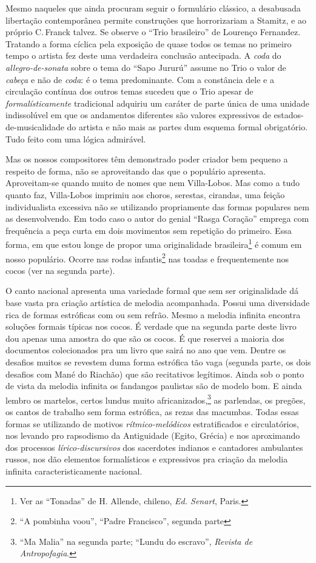 Mesmo naqueles que ainda procuram seguir o formulário clássico, a
desabusada libertação contemporânea permite construções que
horrorizariam a Stamitz, e ao próprio C.\,Franck talvez. Se observe o
``Trio brasileiro'' de Lourenço Fernandez. Tratando a forma cíclica pela
exposição de quase todos os temas no primeiro tempo o artista fez deste
uma verdadeira conclusão antecipada. A \textit{coda} do \textit{allegro-de-sonata} sobre o
tema do ``Sapo Jururú'' assume no Trio o valor de \textit{cabeça} e não de \textit{coda}: é
o tema predominante. Com a constância dele e a circulação contínua dos
outros temas sucedeu que o Trio apesar de \textit{formalísticamente} tradicional
adquiriu um caráter de parte única de uma unidade indissolúvel em que os
andamentos diferentes são valores expressivos de estados-de-musicalidade
do artista e não mais as partes dum esquema formal obrigatório. Tudo
feito com uma lógica admirável.

Mas os nossos compositores têm demonstrado poder criador bem pequeno a
respeito de forma, não se aproveitando das que o populário apresenta.
Aproveitam-se quando muito de nomes que nem Villa-Lobos. Mas como a tudo
quanto faz, Villa-Lobos imprimiu aos choros, serestas, cirandas, uma
feição individualista excessiva não se utilizando propriamente das
formas populares nem as desenvolvendo. Em todo caso o autor do genial
``Rasga Coração'' emprega com frequência a peça curta em dois movimentos
sem repetição do primeiro. Essa forma, em que estou longe de propor uma
originalidade brasileira\footnote{Ver as ``Tonadas'' de H. Allende, chileno, \textit{Ed.
Senart}, Paris.} é comum em nosso populário. Ocorre nas rodas infantis\footnote{``A
pombinha voou'', ``Padre Francisco'', segunda parte} nas toadas e
frequentemente nos cocos (ver na segunda parte).

O canto nacional apresenta uma variedade formal que sem ser
originalidade dá base vasta pra criação artística de melodia
acompanhada. Possui uma diversidade rica de formas estróficas com ou sem
refrão. Mesmo a melodia infinita encontra soluções formais típicas nos
cocos. É verdade que na segunda parte deste livro dou apenas uma amostra
do que são os cocos. É que reservei a maioria dos documentos
colecionados pra um livro que sairá no ano que vem. Dentre os desafios
muitos se revestem duma forma estrófica tão vaga (segunda parte, os dois
desafios com Mané do Riachão) que são recitativos legítimos. Ainda sob
o ponto de vista da melodia infinita os fandangos paulistas são de
modelo bom. E ainda lembro os martelos, certos lundus muito
africanizados,\footnote{``Ma Malia'' na segunda parte; ``Lundu do escravo'', \textit{Revista de
Antropofagia}.} as parlendas, os pregões, os cantos de trabalho
sem forma estrófica, as rezas das macumbas. Todas essas formas se
utilizando de motivos \textit{rítmico-melódicos} estratificados e circulatórios,
nos levando pro rapsodismo da Antiguidade (Egito, Grécia) e nos
aproximando dos processos \textit{lírico-discursivos} dos sacerdotes indianos e
cantadores ambulantes russos, nos dão elementos formalísticos e
expressivos pra criação da melodia infinita caracteristicamente
nacional.

